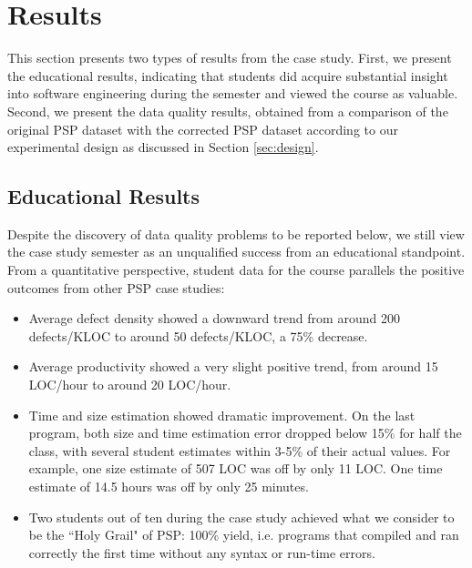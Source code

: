 
\section{Results}
\label{sec:results}

This section presents two types of results from the case study.  First, we
present the educational results, indicating that students did acquire
substantial insight into software engineering during the semester and
viewed the course as valuable.  Second, we present the data quality
results, obtained from a comparison of the original PSP dataset with the
corrected PSP dataset according to our experimental design as discussed in
Section \ref{sec:design}.



\subsection{Educational Results}
\label{sec:education}

Despite the discovery of data quality problems to be reported below, we
still view the case study semester as an unqualified success from an
educational standpoint.  From a quantitative perspective, student data for
the course parallels the positive outcomes from other PSP
case studies:

\begin{itemize}
\item Average defect density showed a downward trend from around 200
    defects/KLOC to around 50 defects/KLOC, a 75\% decrease.

\item Average productivity showed a very slight positive
    trend, from around 15 LOC/hour to around 20 LOC/hour.

\item Time and size estimation showed dramatic improvement. On the
    last program, both size and time estimation error
    dropped below 15\% for half the class, with several
    student estimates within 3-5\% of their actual values. For
    example, one size estimate of 507 LOC was
    off by only 11 LOC. One time estimate of 14.5 hours
    was off by only 25 minutes.

\item Two students out of ten during the case study achieved what we
    consider to be the ``Holy Grail" of PSP: 100\% yield,
    i.e. programs that compiled and ran correctly the first
    time without any syntax or run-time errors.
\end{itemize}

